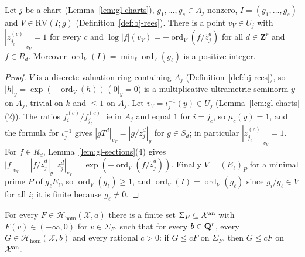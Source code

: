 \begin{lemma}\label{lem:nn-rees-points}
\leanok
{}
Let $j$ be a chart (Lemma~\ref{lem:gl-charts}), $g_1,\dots,g_s\in A_j$ nonzero, $I=(g_1,\dots,g_s)$ and $V\in\mathrm{RV}(I;g)$
(Definition~\ref{def:bj-rees}). There is a point $v_V\in U_j$ with $|z^{(c)}_{j_c}|_{v_V}=1$ for every $c$ and
$\log|f|(v_V)=-\operatorname{ord}_V(f/\tilde z_j^{d})$ for all $d\in\mathbf Z^r$ and $f\in R_d$. Moreover $\operatorname{ord}_V(I)=\min_\ell\operatorname{ord}_V(g_\ell)$ is a
positive integer.
\end{lemma}

\begin{proof}
$V$ is a discrete valuation ring containing $A_j$ (Definition~\ref{def:bj-rees}), so $|h|_y=\exp(-\operatorname{ord}_V(h))$ ($|0|_y=0$) is a multiplicative
ultrametric seminorm $y$ on $A_j$, trivial on $k$ and $\le1$ on $A_j$. Let $v_V=\iota_j^{-1}(y)\in U_j$ (Lemma~\ref{lem:gl-charts}(2)). The ratios
$f^{(c)}_i/f^{(c)}_{j_c}$ lie in $A_j$ and equal $1$ for $i=j_c$, so $\mu_c(y)=1$, and the formula for $\iota_j^{-1}$ gives $|gT^d|_{v_V}=|g/\tilde z_j^d|_y$
for $g\in S_d$; in particular $|z^{(c)}_{j_c}|_{v_V}=1$. For $f\in R_d$, Lemma~\ref{lem:gl-sections}(4) gives
$|f|_{v_V}=|f/\tilde z_j^d|_y\,|z_j^d|_{v_V}=\exp(-\operatorname{ord}_V(f/\tilde z_j^d))$. Finally $V=(E_\ell)_P$ for a minimal prime $P$ of $g_\ell E_\ell$, so
$\operatorname{ord}_V(g_\ell)\ge1$, and $\operatorname{ord}_V(I)=\operatorname{ord}_V(g_\ell)$ since $g_i/g_\ell\in V$ for all $i$; it is finite because $g_\ell\ne0$.
\end{proof}

\begin{lemma}\label{lem:nn-hom-shilov}
\leanok
{}
For every $F\in\mathcal H_{\mathrm{hom}}(\mathcal X,a)$ there is a finite set $\Sigma_F\subseteq\mathcal X^{\mathrm{an}}$ with $F(v)\in(-\infty,0)$ for $v\in\Sigma_F$, such
that for every $b\in\mathbf{Q}^r$, every $G\in\mathcal H_{\mathrm{hom}}(\mathcal X,b)$ and every rational $c>0$: if $G\le cF$ on $\Sigma_F$, then $G\le cF$ on
$\mathcal X^{\mathrm{an}}$.
\end{lemma}

